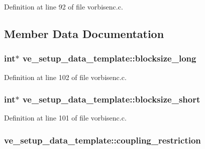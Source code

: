 Definition at line 92 of file vorbisenc.\+c.



\subsection{Member Data Documentation}
\subsubsection[{\texorpdfstring{blocksize\+\_\+long}{blocksize_long}}]{ {\bf int}$\ast$ ve\+\_\+setup\+\_\+data\+\_\+template\+::blocksize\+\_\+long}\hypertarget{structve__setup__data__template_afcb7651018dd96fd68f0e6e5acf6fdac}{}\label{structve__setup__data__template_afcb7651018dd96fd68f0e6e5acf6fdac}


Definition at line 102 of file vorbisenc.\+c.

\subsubsection[{\texorpdfstring{blocksize\+\_\+short}{blocksize_short}}]{ {\bf int}$\ast$ ve\+\_\+setup\+\_\+data\+\_\+template\+::blocksize\+\_\+short}\hypertarget{structve__setup__data__template_a43f266bf64f0c8b6d1b22971a2071546}{}\label{structve__setup__data__template_a43f266bf64f0c8b6d1b22971a2071546}


Definition at line 101 of file vorbisenc.\+c.

\subsubsection[{\texorpdfstring{coupling\+\_\+restriction}{coupling_restriction}}]{ ve\+\_\+setup\+\_\+data\+\_\+template\+::coupling\+\_\+restriction}\hypertarget{structve__setup__data__template_a19a542524d81938a074503da7b6aeea8}{}\label{structve__setup__data__template_a19a542524d81938a074503da7b6aeea8}


